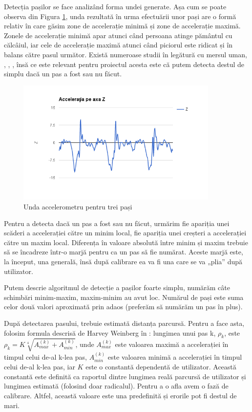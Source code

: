 \documentclass[12pt, a4paper, oneside]{article}
\begin{document}
Detecția pașilor se face analizând forma undei generate. Așa cum se poate observa din Figura \ref{fig:walk_wave}, unda rezultată în urma efectuării unor pași are o formă relativ în care găsim zone de accelerație minimă și zone de accelerație maximă. Zonele de accelerație minimă apar atunci când persoana atinge pământul cu călcâiul, iar cele de accelerație maximă atunci când piciorul este ridicat și în balans către pasul următor. Există numeroase studii în legătură cu mersul uman, \cite{HumanWalkAndRunParameters}, \cite{HumanGaitCycle}, \cite{WalkCycle}, însă ce este relevant pentru proiectul acesta este că putem detecta destul de simplu dacă un pas a fost sau nu făcut.

\begin{figure}[h]
\centering
\includegraphics[width=10cm]{figures/walk_wave.png}
\caption{Unda accelerometru pentru trei pași}
\label{fig:walk_wave}
\end{figure}

Pentru a detecta dacă un pas a fost sau nu făcut, urmărim fie apariția unei scăderi a accelerației către un minim local, fie apariția unei creșteri a accelerației către un maxim local. Diferența în valoare absolută între minim și maxim trebuie să se încadreze într-o marjă pentru ca un pas să fie numărat. Aceste marjă este, la început, una generală, însă după calibrare ea va fi una care se va „plia” după utilizator.

Putem descrie algoritmul de detecție a pașilor foarte simplu, numărăm câte schimbări minim-maxim, maxim-minim au avut loc. Numărul de pași este suma celor două valori aproximată prin adaos (preferăm să numărăm un pas în plus).

După detectarea pasului, trebuie estimată distanța parcursă. Pentru a face asta, folosim formula descrisă de Harvey Weinberg în \cite{HarveyWeinberg}: lungimea unui pas k, $\rho_{k}$, este $\rho_{k} = K \sqrt[4]{A_{max}^{(k)} + A_{min}^{(k)}}$, unde $A_{max}^{(k)}$ este valoarea maximă a accelerației în timpul celui de-al k-lea pas, $A_{min}^{(k)}$ este valoarea minimă a accelerației în timpul celui de-al k-lea pas, iar $K$ este o constantă dependentă de utilizator. Această constantă este definită ca raportul dintre lungimea reală parcursă de utilizator și lungimea estimată (folosind doar radicalul). Pentru a o afla avem o fază de calibrare. Altfel, această valoare este una predefinită și erorile pot fi destul de mari.
\end{document}
